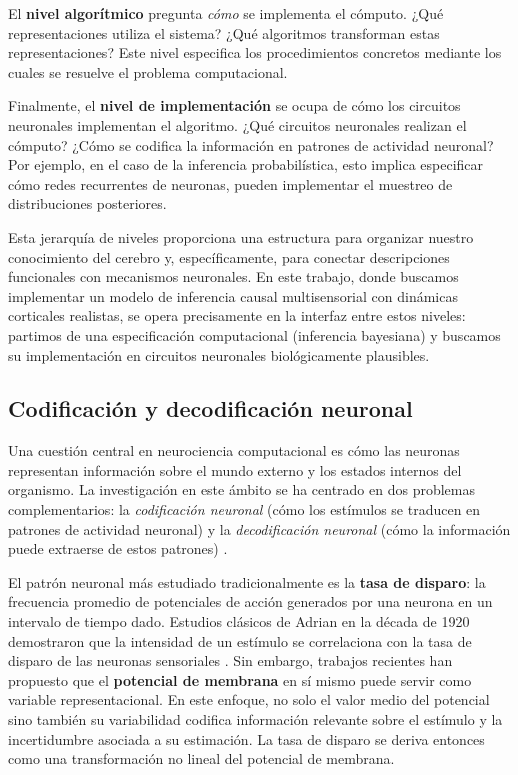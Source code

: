 El \textbf{nivel algorítmico} pregunta \textit{cómo} se implementa el cómputo. ¿Qué representaciones utiliza el sistema? ¿Qué algoritmos transforman estas representaciones? Este nivel especifica los procedimientos concretos mediante los cuales se resuelve el problema computacional.

Finalmente, el \textbf{nivel de implementación} se ocupa de cómo los circuitos neuronales implementan el algoritmo. ¿Qué circuitos neuronales realizan el cómputo? ¿Cómo se codifica la información en patrones de actividad neuronal? Por ejemplo, en el caso de la inferencia probabilística, esto implica especificar cómo redes recurrentes de neuronas, pueden implementar el muestreo de distribuciones posteriores.

Esta jerarquía de niveles proporciona una estructura para organizar nuestro conocimiento del cerebro y, específicamente, para conectar descripciones funcionales con mecanismos neuronales. En este trabajo, donde buscamos implementar un modelo de inferencia causal multisensorial con dinámicas corticales realistas, se opera precisamente en la interfaz entre estos niveles: partimos de una especificación computacional (inferencia bayesiana) y buscamos su implementación en circuitos neuronales biológicamente plausibles.

\subsection{Codificación y decodificación neuronal}
\label{subsec:codificacion_neuronal}

Una cuestión central en neurociencia computacional es cómo las neuronas representan información sobre el mundo externo y los estados internos del organismo. La investigación en este ámbito se ha centrado en dos problemas complementarios: la \textit{codificación neuronal} (cómo los estímulos se traducen en patrones de actividad neuronal) y la \textit{decodificación neuronal} (cómo la información puede extraerse de estos patrones) \citep{dayan2005theoretical}.

El patrón neuronal más estudiado tradicionalmente es la \textbf{tasa de disparo}: la frecuencia promedio de potenciales de acción generados por una neurona en un intervalo de tiempo dado. Estudios clásicos de Adrian en la década de 1920 demostraron que la intensidad de un estímulo se correlaciona con la tasa de disparo de las neuronas sensoriales \citep{blanco2014historia}. Sin embargo, trabajos recientes han propuesto que el \textbf{potencial de membrana} en sí mismo puede servir como variable representacional. En este enfoque, no solo el valor medio del potencial sino también su variabilidad codifica información relevante sobre el estímulo y la incertidumbre asociada a su estimación. La tasa de disparo se deriva entonces como una transformación no lineal del potencial de membrana.

